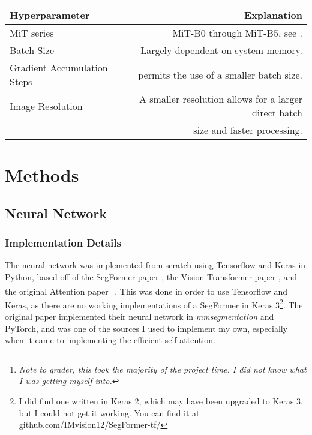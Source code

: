 \documentclass[12pt]{article}
\begin{document}
    \begin{center}
        \begin{tabular}{| l | r |}
            \hline
            \textbf{Hyperparameter} & \textbf{Explanation} \\
            \hline
            MiT series & MiT-B0 through MiT-B5, see \cite{DBLP:journals/corr/abs-2105-15203}. \\
            \hline
            Batch Size & Largely dependent on system memory. \\
            \hline
            Gradient Accumulation Steps & permits the use of a smaller batch size. \\
            \hline
            Image Resolution & A smaller resolution allows for a larger direct batch \\ & size and faster processing. \\
            \hline
        \end{tabular}
    \end{center}

    \section{Methods}

    \subsection*{Neural Network}

    \subsubsection*{Implementation Details}

    The neural network was implemented from scratch using Tensorflow and Keras in Python, based off of the SegFormer paper \cite{DBLP:journals/corr/abs-2105-15203}, the Vision Transformer paper \cite{ DBLP:journals/corr/abs-2010-11929}, and the original Attention paper \cite{DBLP:journals/corr/VaswaniSPUJGKP17}\footnote{\textit{Note to grader, this took the majority of the project time. I did not know what I was getting myself into.}}. This was done in order to use Tensorflow and Keras, as there are no working implementations of a SegFormer in Keras 3\footnote{I did find one written in Keras 2, which may have been upgraded to Keras 3, but I could not get it working. You can find it at github.com/IMvision12/SegFormer-tf/}. The original paper implemented their neural network in \textit{mmsegmentation} and PyTorch, and was one of the sources I used to implement my own, especially when it came to implementing the efficient self attention.
\end{document}
